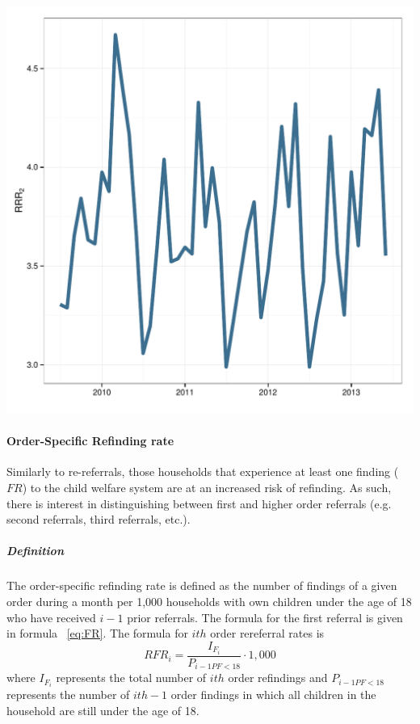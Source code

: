 \documentclass[12pt]{article}\usepackage[]{graphicx}\usepackage[]{color}
\makeatletter
\def\maxwidth{ %
  \ifdim\Gin@nat@width>\linewidth
    \linewidth
  \else
    \Gin@nat@width
  \fi
}
\newenvironment{knitrout}{}{} %
\makeatother
\begin{document}
\begin{knitrout}
{\centering \includegraphics[width=\maxwidth]{figure/RRRi} 

}



\end{knitrout}


\paragraph{Order-Specific Refinding rate} Similarly to re-referrals, those households that experience at least one finding ($FR$) to the child welfare system are at an increased risk of refinding. As such, there is interest in distinguishing between first and higher order referrals (e.g. second referrals, third referrals, etc.). 

\subparagraph{Definition} The order-specific refinding rate is defined as the number of findings of a given order during a month per 1,000 households with own children under the age of 18 who have received $i-1$ prior referrals. The formula for the first referral is given in formula ~\ref{eq:FR}. The formula for $ith$ order rereferral rates is 
\begin{equation}\label{eq:RRRi}
RFR_i = \frac{I_{F_i}}{P_{i-1PF<18}} \cdot 1,000
\end{equation}
where $I_{F_i}$ represents the total number of $ith$ order refindings and $P_{i-1PF<18}$ represents the number of $ith-1$ order findings in which all children in the household are still under the age of 18.  
\end{document}
